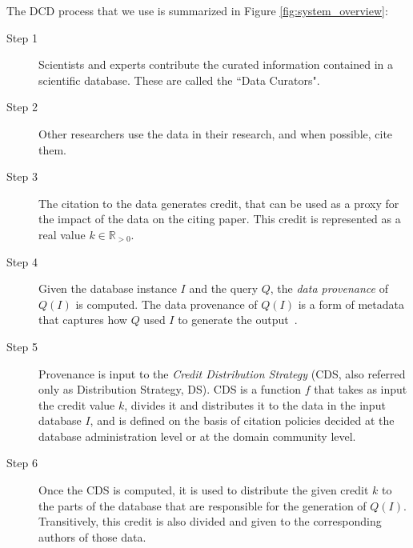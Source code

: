 \documentclass[preprint,12pt,sort&compress]{elsarticle}
\newcommand{\eat}[1]{}
\newcommand{\scream}[1]{{\bf * #1 *}{\typeout{#1}}}
\begin{document}
\vspace{0.15in}
The DCD process that we use is summarized in Figure \ref{fig:system_overview}:
\vspace{0.15in}
\begin{description}
	\item[Step 1] Scientists and experts contribute 
	the curated information contained in a scientific database.  These are called the ``Data Curators".  
	\item[Step 2] Other researchers use the data in their research, and when possible, cite them. 
	\item[Step 3] The citation to the data generates credit, that can be used as a proxy for the impact of the data on the citing paper. This credit is represented as a real value $k \in \mathbb{R}_{>0}$. 
	\item[Step 4] Given the database instance $I$ and the query $Q$,  the \emph{data provenance} of $Q(I)$ is computed. The data provenance of $Q(I)$ is a form of metadata that captures how 
	$Q$ used $I$ to generate the output~\citep{CheneyProvSurvey}. 
	\eat{, describing different kinds of relationships between data in the input and the output of a query. As reported in \citep{CheneyProvSurvey}, these provenances have been used in several applications beyond giving information on how queries work, for example, annotation propagation and the view update problem. }
	\item[Step 5] Provenance is input to the 
	\eat{DCD problem, whose aim is to compute the} \emph{Credit Distribution Strategy} (CDS, also referred only as Distribution Strategy, DS). CDS is a function $f$ that takes as input the credit value $k $, divides it and distributes it to the data in the input database $I$, and is defined on the basis of citation policies decided at the database administration level or at the domain community level. 
	\eat{In this paper, since we base CDS on data provenance, we describe four CDS, each one based on a different form of provenance. }
	\item[Step 6] Once the CDS is computed, it is used to distribute the given credit $k$ to the parts of the database that are responsible for the generation of $Q(I)$. Transitively, this credit is also divided and given to the corresponding authors of those data.
\end{description}
\end{document}
